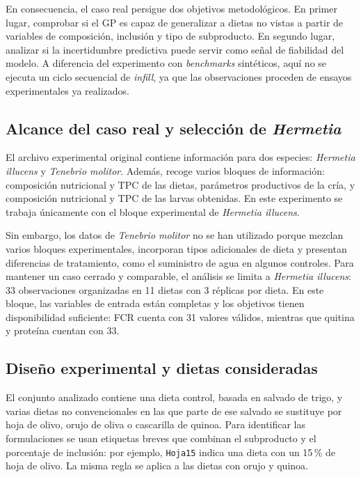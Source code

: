 En consecuencia, el caso real persigue dos objetivos metodológicos. En primer lugar, comprobar si el GP es capaz de generalizar a dietas no vistas a partir de variables de composición, inclusión y tipo de subproducto. En segundo lugar, analizar si la incertidumbre predictiva puede servir como señal de fiabilidad del modelo. A diferencia del experimento con \emph{benchmarks} sintéticos, aquí no se ejecuta un ciclo secuencial de \emph{infill}, ya que las observaciones proceden de ensayos experimentales ya realizados.

\subsection{Alcance del caso real y selección de \textit{Hermetia}}
\label{subsec:alcance_hermetia_caso_real}

El archivo experimental original contiene información para dos especies: \textit{Hermetia illucens} y \textit{Tenebrio molitor}. Además, recoge varios bloques de información: composición nutricional y TPC de las dietas, parámetros productivos de la cría, y composición nutricional y TPC de las larvas obtenidas. En este experimento se trabaja únicamente con el bloque experimental de \textit{Hermetia illucens}.

Sin embargo, los datos de \textit{Tenebrio molitor} no se han utilizado porque mezclan varios bloques experimentales, incorporan tipos adicionales de dieta y presentan diferencias de tratamiento, como el suministro de agua en algunos controles. Para mantener un caso cerrado y comparable, el análisis se limita a \textit{Hermetia illucens}: 33 observaciones organizadas en 11 dietas con 3 réplicas por dieta. En este bloque, las variables de entrada están completas y los objetivos tienen disponibilidad suficiente: FCR cuenta con 31 valores válidos, mientras que quitina y proteína cuentan con 33.

\subsection{Diseño experimental y dietas consideradas}
\label{subsec:diseno_dietas_caso_real}

El conjunto analizado contiene una dieta control, basada en salvado de trigo, y varias dietas no convencionales en las que parte de ese salvado se sustituye por hoja de olivo, orujo de oliva o cascarilla de quinoa. Para identificar las formulaciones se usan etiquetas breves que combinan el subproducto y el porcentaje de inclusión: por ejemplo, \texttt{Hoja15} indica una dieta con un 15\,\% de hoja de olivo. La misma regla se aplica a las dietas con orujo y quinoa.

